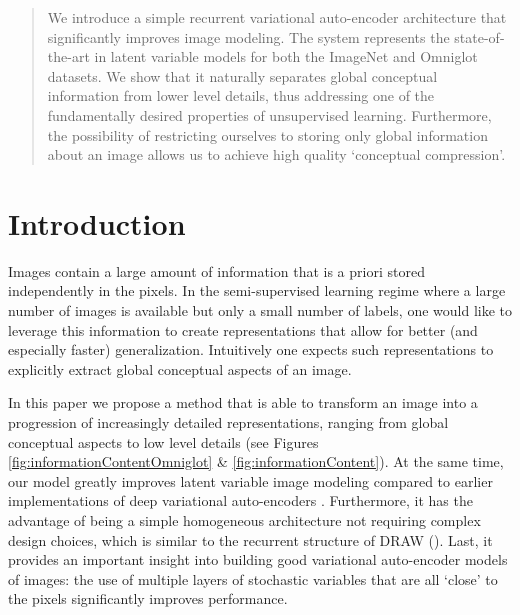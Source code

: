 \documentclass{article}
\begin{document}
 




\begin{abstract} 
We introduce a simple recurrent variational auto-encoder architecture that significantly improves image modeling. 
The system represents the state-of-the-art in latent variable models for both the ImageNet and Omniglot datasets. 
We show that it naturally separates global conceptual information from lower level details, thus addressing one of the fundamentally desired properties of unsupervised learning. 
Furthermore, the possibility of restricting ourselves to storing only global information about an image allows us to achieve high quality `conceptual compression'.
\end{abstract} 






\section{Introduction}
\label{Introduction}

Images contain a large amount of information that is a priori stored independently in the pixels. In the semi-supervised learning regime where a large number of images is available but only a small number of labels, one would like to leverage this information to create representations that allow for better (and especially faster) generalization. Intuitively one expects such representations to explicitly extract global conceptual aspects of an image.

In this paper we propose a method that is able to transform an image into a progression of increasingly detailed representations, ranging from global conceptual aspects to low level details (see Figures \ref{fig:informationContentOmniglot} \& \ref{fig:informationContent}). At the same time, our model greatly improves latent variable image modeling compared to earlier implementations of deep variational auto-encoders \citep{kingma2013auto, rezende2014stochastic, gregor2013deep}. Furthermore, it has the advantage of being a simple homogeneous architecture not requiring complex design choices, which is similar to the recurrent structure of DRAW (\citealp{gregor2015draw}). Last, it provides an important insight into building good variational auto-encoder models of images: the use of multiple layers of stochastic variables that are all `close' to the pixels significantly improves performance. 
\end{document}
